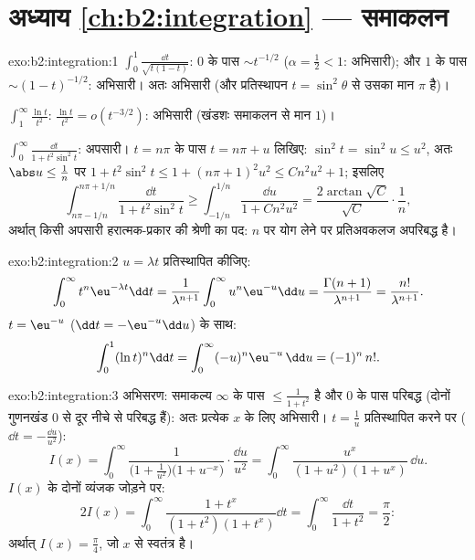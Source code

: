 \section*{अध्याय \ref{ch:b2:integration} --- समाकलन}

\begin{solution}{exo:b2:integration:1}
$\int_0^1 \frac{\dd t}{\sqrt{t(1-t)}}$: $0$ के पास $\sim t^{-1/2}$ ($\alpha = \frac12 < 1$: अभिसारी); और $1$ के पास $\sim
(1-t)^{-1/2}$: अभिसारी। अतः
अभिसारी (और प्रतिस्थापन $t = \sin^2\theta$ से उसका मान $\pi$ है)।

$\int_1^\infty \frac{\ln t}{t^2}$: $\frac{\ln t}{t^2} = o(t^{-3/2})$: अभिसारी (खंडशः समाकलन से मान $1$)।

$\int_0^\infty \frac{\dd t}{1 + t^2\sin^2 t}$: अपसारी। $t =
n\pi$ के पास $t = n\pi + u$ लिखिए: $\sin^2 t = \sin^2 u \leq u^2$, अतः $\abs u \leq \frac{1}{n}$ पर $1 + t^2\sin^2 t \leq 1 + (n\pi +
1)^2u^2 \leq C n^2 u^2 + 1$; इसलिए
\[
\int_{n\pi - 1/n}^{n\pi + 1/n} \frac{\dd t}{1 + t^2\sin^2 t}
\geq \int_{-1/n}^{1/n} \frac{\dd u}{1 + Cn^2u^2}
= \frac{2\arctan\sqrt C}{\sqrt C}\cdot\frac{1}{n} ,
\]
अर्थात् किसी अपसारी हरात्मक-प्रकार की श्रेणी का पद: $n$ पर योग लेने पर
प्रतिअवकलज अपरिबद्ध है।
\end{solution}

\begin{solution}{exo:b2:integration:2}
$u = \lambda t$ प्रतिस्थापित कीजिए:
\[
\int_0^\infty t^n \eu^{-\lambda t}\dd t
= \frac{1}{\lambda^{n+1}}\int_0^\infty u^n\eu^{-u}\dd u
= \frac{\Gamma(n+1)}{\lambda^{n+1}} = \frac{n!}{\lambda^{n+1}} .
\]
$t = \eu^{-u}$ ($\dd t = -\eu^{-u}\dd u$) के साथ:
\[
\int_0^1 (\ln t)^n \dd t = \int_0^{\infty} (-u)^n \eu^{-u}\,\dd u
= (-1)^n\, n! .
\]
\end{solution}

\begin{solution}{exo:b2:integration:3}
अभिसरण: समाकल्य $\infty$ के पास $\leq \frac{1}{1+t^2}$ है और $0$ के पास परिबद्ध (दोनों गुणनखंड
$0$ से दूर नीचे से परिबद्ध हैं): अतः प्रत्येक $x$ के लिए 
अभिसारी। $t = \frac1u$ प्रतिस्थापित करने पर ($\dd t = -\frac{\dd u}{u^2}$):
\[
I(x) = \int_0^\infty \frac{1}{\bigl(1 +
\frac1{u^2}\bigr)\bigl(1 + u^{-x}\bigr)}\cdot\frac{\dd u}{u^2}
= \int_0^\infty \frac{u^x}{(1 + u^2)(1 + u^x)}\,\dd u .
\]
$I(x)$ के दोनों व्यंजक जोड़ने पर:
\[
2I(x) = \int_0^\infty \frac{1 + t^x}{(1+t^2)(1+t^x)}\dd t
= \int_0^\infty \frac{\dd t}{1 + t^2} = \frac{\pi}{2} :
\]
अर्थात् $I(x) = \frac\pi4$, जो $x$ से स्वतंत्र है।
\end{solution}

